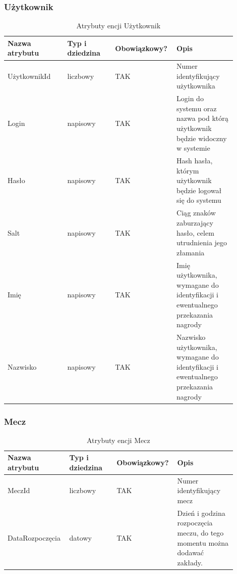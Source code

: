 \documentclass{mwrep}
\begin{document}
\subsubsection{Użytkownik}
\begin{table}[H]
	\begin{tabular}{|p{0.25\linewidth}|p{0.2\linewidth}|p{0.2\linewidth}|p{0.25\linewidth}|}
	\hline
	Nazwa atrybutu & Typ i dziedzina & Obowiązkowy? & Opis                                                           \\ \hline
	UżytkownikId   & liczbowy                            & TAK                              & Numer identyfikujący użytkownika                                                   \\ \hline
	Login          & napisowy                            & TAK                              & Login do systemu oraz nazwa pod którą użytkownik będzie widoczny w systemie         \\ \hline
	Hasło          & napisowy                            & TAK                              & Hash hasła, którym użytkownik będzie logował się do systemu                        \\ \hline
	Salt           & napisowy                            & TAK                              & Ciąg znaków zaburzający hasło, celem utrudnienia jego złamania                     \\ \hline
	Imię           & napisowy                            & TAK                              & Imię użytkownika, wymagane do identyfikacji i ewentualnego przekazania nagrody     \\ \hline
	Nazwisko       & napisowy                            & TAK                              & Nazwisko użytkownika, wymagane do identyfikacji i ewentualnego przekazania nagrody \\ \hline
	\end{tabular}
	\caption{Atrybuty encji Użytkownik}
\end{table}

\subsubsection{Mecz}
\begin{table}[H]
	\begin{tabular}{|p{0.25\linewidth}|p{0.2\linewidth}|p{0.2\linewidth}|p{0.25\linewidth}|}
	\hline
	Nazwa atrybutu & Typ i dziedzina & Obowiązkowy? & Opis                                                           \\ \hline
	MeczId   & liczbowy                            & TAK                              & Numer identyfikujący mecz                                                  \\ \hline
	DataRozpoczęcia          & datowy                            & TAK                              & Dzień i godzina rozpoczęcia meczu, do tego momentu można dodawać zakłady.       \\ \hline
	\end{tabular}
	\caption{Atrybuty encji Mecz}
\end{table}
\end{document}
